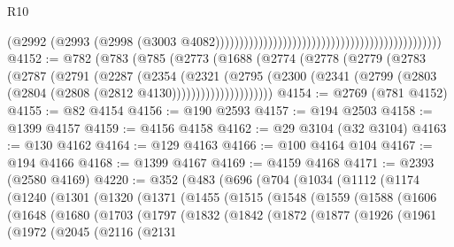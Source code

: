 \begin{lexlean}{R10}
\begin{coremodule}
                                                                                          (@2992
                                                                                            (@2993
                                                                                              (@2998
                                                                                                (@3003
                                                                                                  @4082)))))))))))))))))))))))))))))))))))))))))))))))
@4152 := @782
    (@783
      (@785
        (@2773
          (@1688
            (@2774
              (@2778
                (@2779
                  (@2783
                    (@2787
                      (@2791
                        (@2287
                          (@2354
                            (@2321
                              (@2795
                                (@2300
                                  (@2341
                                    (@2799 (@2803 (@2804 (@2808 (@2812 @4130)))))))))))))))))))))
@4154 := @2769 (@781 @4152)
@4155 := @82 @4154
@4156 := @190 @2593
@4157 := @194 @2503
@4158 := @1399 @4157
@4159 := @4156 @4158
@4162 := @29 @3104 (@32 @3104)
@4163 := @130 @4162
@4164 := @129 @4163
@4166 := @100 @4164 @104
@4167 := @194 @4166
@4168 := @1399 @4167
@4169 := @4159 @4168
@4171 := @2393 (@2580 @4169)
@4220 := @352
    (@483
      (@696
        (@704
          (@1034
            (@1112
              (@1174
                (@1240
                  (@1301
                    (@1320
                      (@1371
                        (@1455
                          (@1515
                            (@1548
                              (@1559
                                (@1588
                                  (@1606
                                    (@1648
                                      (@1680
                                        (@1703
                                          (@1797
                                            (@1832
                                              (@1842
                                                (@1872
                                                  (@1877
                                                    (@1926
                                                      (@1961
                                                        (@1972
                                                          (@2045
                                                            (@2116
                                                              (@2131

\end{coremodule}
\end{lexlean}
